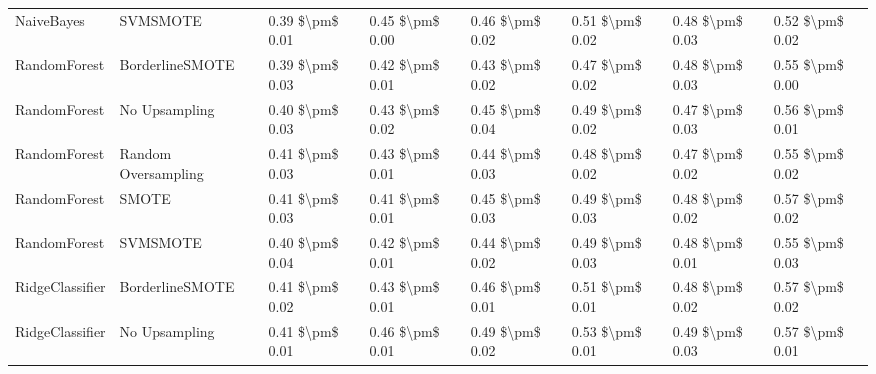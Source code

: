 \begin{tabular}{llllllll}
                     NaiveBayes &                      SVMSMOTE & 0.39 \$\textbackslash pm\$ 0.01 &           0.45 \$\textbackslash pm\$ 0.00 &       0.46 \$\textbackslash pm\$ 0.02 &        0.51 \$\textbackslash pm\$ 0.02 &                         0.48 \$\textbackslash pm\$ 0.03 &     0.52 \$\textbackslash pm\$ 0.02 \\
                   RandomForest &               BorderlineSMOTE & 0.39 \$\textbackslash pm\$ 0.03 &           0.42 \$\textbackslash pm\$ 0.01 &       0.43 \$\textbackslash pm\$ 0.02 &        0.47 \$\textbackslash pm\$ 0.02 &                         0.48 \$\textbackslash pm\$ 0.03 &     0.55 \$\textbackslash pm\$ 0.00 \\
                   RandomForest &                 No Upsampling & 0.40 \$\textbackslash pm\$ 0.03 &           0.43 \$\textbackslash pm\$ 0.02 &       0.45 \$\textbackslash pm\$ 0.04 &        0.49 \$\textbackslash pm\$ 0.02 &                         0.47 \$\textbackslash pm\$ 0.03 &     0.56 \$\textbackslash pm\$ 0.01 \\
                   RandomForest &           Random Oversampling & 0.41 \$\textbackslash pm\$ 0.03 &           0.43 \$\textbackslash pm\$ 0.01 &       0.44 \$\textbackslash pm\$ 0.03 &        0.48 \$\textbackslash pm\$ 0.02 &                         0.47 \$\textbackslash pm\$ 0.02 &     0.55 \$\textbackslash pm\$ 0.02 \\
                   RandomForest &                         SMOTE & 0.41 \$\textbackslash pm\$ 0.03 &           0.41 \$\textbackslash pm\$ 0.01 &       0.45 \$\textbackslash pm\$ 0.03 &        0.49 \$\textbackslash pm\$ 0.03 &                         0.48 \$\textbackslash pm\$ 0.02 &     0.57 \$\textbackslash pm\$ 0.02 \\
                   RandomForest &                      SVMSMOTE & 0.40 \$\textbackslash pm\$ 0.04 &           0.42 \$\textbackslash pm\$ 0.01 &       0.44 \$\textbackslash pm\$ 0.02 &        0.49 \$\textbackslash pm\$ 0.03 &                         0.48 \$\textbackslash pm\$ 0.01 &     0.55 \$\textbackslash pm\$ 0.03 \\
                RidgeClassifier &               BorderlineSMOTE & 0.41 \$\textbackslash pm\$ 0.02 &           0.43 \$\textbackslash pm\$ 0.01 &       0.46 \$\textbackslash pm\$ 0.01 &        0.51 \$\textbackslash pm\$ 0.01 &                         0.48 \$\textbackslash pm\$ 0.02 &     0.57 \$\textbackslash pm\$ 0.02 \\
                RidgeClassifier &                 No Upsampling & 0.41 \$\textbackslash pm\$ 0.01 &           0.46 \$\textbackslash pm\$ 0.01 &       0.49 \$\textbackslash pm\$ 0.02 &        0.53 \$\textbackslash pm\$ 0.01 &                         0.49 \$\textbackslash pm\$ 0.03 &     0.57 \$\textbackslash pm\$ 0.01 \\

\end{tabular}
